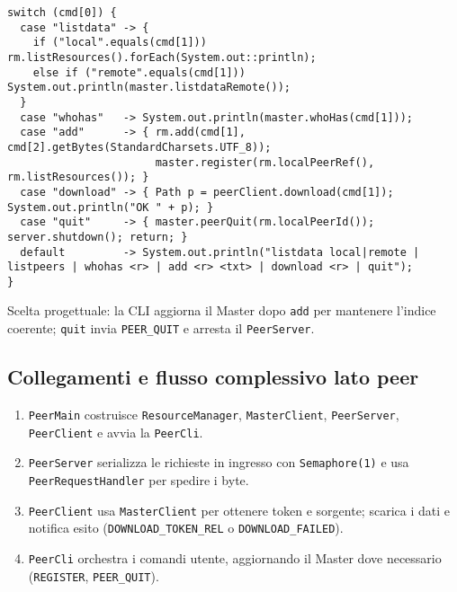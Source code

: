 \documentclass[a4paper,12pt]{article}
\begin{document}
\begin{lstlisting}
switch (cmd[0]) {
  case "listdata" -> {
    if ("local".equals(cmd[1])) rm.listResources().forEach(System.out::println);
    else if ("remote".equals(cmd[1])) System.out.println(master.listdataRemote());
  }
  case "whohas"   -> System.out.println(master.whoHas(cmd[1]));
  case "add"      -> { rm.add(cmd[1], cmd[2].getBytes(StandardCharsets.UTF_8));
                       master.register(rm.localPeerRef(), rm.listResources()); }
  case "download" -> { Path p = peerClient.download(cmd[1]); System.out.println("OK " + p); }
  case "quit"     -> { master.peerQuit(rm.localPeerId()); server.shutdown(); return; }
  default         -> System.out.println("listdata local|remote | listpeers | whohas <r> | add <r> <txt> | download <r> | quit");
}
\end{lstlisting}

Scelta progettuale: la CLI aggiorna il Master dopo \texttt{add} per mantenere l’indice coerente; \texttt{quit} invia \texttt{PEER\_QUIT} e arresta il \texttt{PeerServer}.

\subsection*{Collegamenti e flusso complessivo lato peer}
\begin{enumerate}[nosep]
  \item \texttt{PeerMain} costruisce \texttt{ResourceManager}, \texttt{MasterClient}, \texttt{PeerServer}, \texttt{PeerClient} e avvia la \texttt{PeerCli}.
  \item \texttt{PeerServer} serializza le richieste in ingresso con \texttt{Semaphore(1)} e usa \texttt{PeerRequestHandler} per spedire i byte.
  \item \texttt{PeerClient} usa \texttt{MasterClient} per ottenere token e sorgente; scarica i dati e notifica esito (\texttt{DOWNLOAD\_TOKEN\_REL} o \texttt{DOWNLOAD\_FAILED}).
  \item \texttt{PeerCli} orchestra i comandi utente, aggiornando il Master dove necessario (\texttt{REGISTER}, \texttt{PEER\_QUIT}).
\end{enumerate}
\end{document}
